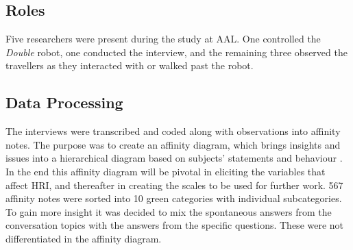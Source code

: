 \subsection{Roles}
Five researchers were present during the study at AAL. One controlled the \textit{Double} robot, one conducted the interview, and the remaining three observed the travellers as they interacted with or walked past the robot. 

\subsection{Data Processing}
The interviews were transcribed and coded along with observations into affinity notes. The purpose was to create an affinity diagram, which brings insights and issues into a hierarchical diagram based on subjects' statements and behaviour \cite{Wendell2005}. In the end this affinity diagram will be pivotal in eliciting the variables that affect HRI, and thereafter in creating the scales to be used for further work. 
567 affinity notes were sorted into 10 green categories with individual subcategories. To gain more insight it was decided to mix the spontaneous answers from the conversation topics with the answers from the specific questions. These were not differentiated in the affinity diagram.




